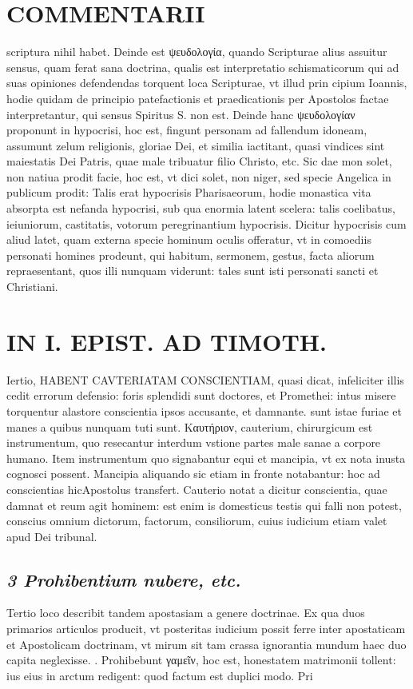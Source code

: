 \documentclass{article}
\begin{document}
\begin{pages}
\section*{COMMENTARII }
\marginpar{[ p.88 ]}\pstart scriptura nihil habet. Deinde est ψευδολογία, quando Scripturae alius assuitur sensus, quam ferat sana doctrina, qualis est interpretatio schismaticorum qui ad suas opiniones defendendas torquent loca Scripturae, vt illud prin cipium Ioannis, hodie quidam de principio patefactionis et praedicationis per Apostolos factae interpretantur, qui sensus Spiritus S. non est. Deinde hanc ψευδολογίαν proponunt in hypocrisi, hoc est, fingunt personam ad fallendum idoneam, assumunt zelum religionis, gloriae Dei, et similia iactitant, quasi vindices sint maiestatis Dei Patris, quae male tribuatur filio Christo, etc. Sic dae mon solet, non natiua prodit facie, hoc est, vt dici solet, non niger, sed specie Angelica in publicum prodit: Talis erat hypocrisis Pharisaeorum, hodie monastica vita absorpta est nefanda hypocrisi, sub qua enormia latent scelera: talis coelibatus, ieiuniorum, castitatis, votorum peregrinantium hypocrisis. Dicitur hypocrisis cum aliud latet, quam externa specie hominum oculis offeratur, vt in comoediis personati homines prodeunt, qui habitum, sermonem, gestus, facta aliorum repraesentant, quos illi nunquam viderunt: tales sunt isti personati sancti et Christiani.  \pend
\section*{IN I. EPIST. AD TIMOTH. }
\marginpar{[ p.89 ]}\pstart Iertio, HABENT CAVTERIATAM CONSCIENTIAM, quasi dicat, infeliciter illis cedit errorum defensio: foris splendidi sunt doctores, et Promethei: intus misere torquentur alastore conscientia ipsos accusante, et damnante. sunt istae furiae et manes a quibus nunquam tuti sunt. Καυτήριον, cauterium, chirurgicum est instrumentum, quo resecantur interdum vstione partes male sanae a corpore humano. Item instrumentum quo signabantur equi et mancipia, vt ex nota inusta cognosci possent. Mancipia aliquando sic etiam in fronte notabantur: hoc ad conscientias hicApostolus transfert. Cauterio notat a dicitur conscientia, quae damnat et reum agit hominem: est enim is domesticus testis qui falli non potest, conscius omnium dictorum, factorum, consiliorum, cuius iudicium etiam valet apud Dei tribunal.  \pend
{}
{}
\subsection*{\textit{3 Prohibentium nubere, etc. }}\pstart Tertio loco describit tandem apostasiam a genere doctrinae. Ex qua duos primarios articulos producit, vt posteritas iudicium possit ferre inter apostaticam et Apostolicam doctrinam, vt mirum sit tam crassa ignorantia mundum haec duo capita neglexisse.  \pend{}. Prohibebunt γαμεῖν, hoc est, honestatem matrimonii tollent: ius eius in arctum redigent: quod factum est duplici modo. Pri\pend

\end{pages}
\end{document}
